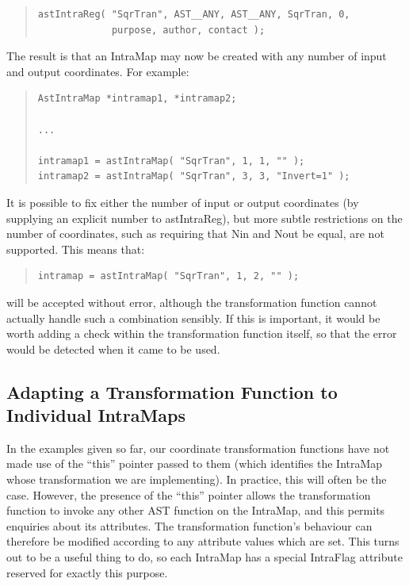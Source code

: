 \documentclass[twoside,11pt]{article}
\newcommand{\htmlref}[2]{#1}
\begin{document}
\begin{quote}
\small
\begin{verbatim}
astIntraReg( "SqrTran", AST__ANY, AST__ANY, SqrTran, 0,
             purpose, author, contact );
\end{verbatim}
\normalsize
\end{quote}

The result is that an \htmlref{IntraMap}{IntraMap} may now be created with any number of
input and output coordinates. For example:

\begin{quote}
\small
\begin{verbatim}
AstIntraMap *intramap1, *intramap2;

...

intramap1 = astIntraMap( "SqrTran", 1, 1, "" );
intramap2 = astIntraMap( "SqrTran", 3, 3, "Invert=1" );
\end{verbatim}
\normalsize
\end{quote}

It is possible to fix either the number of input or output coordinates
(by supplying an explicit number to \htmlref{astIntraReg}{astIntraReg}), but more subtle
restrictions on the number of coordinates, such as requiring that \htmlref{Nin}{Nin}
and \htmlref{Nout}{Nout} be equal, are not supported. This means that:

\begin{quote}
\small
\begin{verbatim}
intramap = astIntraMap( "SqrTran", 1, 2, "" );
\end{verbatim}
\normalsize
\end{quote}

will be accepted without error, although the transformation function
cannot actually handle such a combination sensibly. If this is
important, it would be worth adding a check within the transformation
function itself, so that the error would be detected when it came to
be used.

\subsection{\label{ss:intraflag}Adapting a Transformation Function to Individual IntraMaps}

In the examples given so far, our coordinate transformation functions
have not made use of the ``this'' pointer passed to them (which
identifies the \htmlref{IntraMap}{IntraMap} whose transformation we are implementing). In
practice, this will often be the case. However, the presence of the
``this'' pointer allows the transformation function to invoke any
other AST function on the IntraMap, and this permits enquiries about
its attributes. The transformation function's behaviour can therefore
be modified according to any attribute values which are set. This
turns out to be a useful thing to do, so each IntraMap has a special
\htmlref{IntraFlag}{IntraFlag} attribute reserved for exactly this purpose.
\end{document}
